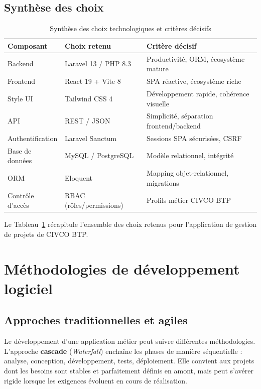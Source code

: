 \subsection{Synthèse des choix}

\begin{table}[H]
\caption{Synthèse des choix technologiques et critères décisifs}
\label{tab:tech_choices}
\centering
\small
\begin{tabular}{|l|l|p{7cm}|}
\hline
\textbf{Composant} & \textbf{Choix retenu} & \textbf{Critère décisif} \\
\hline
Backend & Laravel 13 / PHP 8.3 & Productivité, ORM, écosystème mature \\
\hline
Frontend & React 19 + Vite 8 & SPA réactive, écosystème riche \\
\hline
Style UI & Tailwind CSS 4~\cite{tailwindcss} & Développement rapide, cohérence visuelle \\
\hline
API & REST / JSON & Simplicité, séparation frontend/backend \\
\hline
Authentification & Laravel Sanctum & Sessions SPA sécurisées, CSRF \\
\hline
Base de données & MySQL / PostgreSQL & Modèle relationnel, intégrité \\
\hline
ORM & Eloquent & Mapping objet-relationnel, migrations \\
\hline
Contrôle d'accès & RBAC (rôles/permissions) & Profils métier CIVCO BTP \\
\hline
\end{tabular}
\end{table}

Le Tableau~\ref{tab:tech_choices} récapitule l'ensemble des choix retenus pour
l'application de gestion de projets de CIVCO BTP.

\section{Méthodologies de développement logiciel}

\subsection{Approches traditionnelles et agiles}

Le développement d'une application métier peut suivre différentes méthodologies.
L'approche \textbf{cascade} (\textit{Waterfall}) enchaîne les phases de manière
séquentielle : analyse, conception, développement, tests, déploiement. Elle convient
aux projets dont les besoins sont stables et parfaitement définis en amont, mais
peut s'avérer rigide lorsque les exigences évoluent en cours de réalisation.


